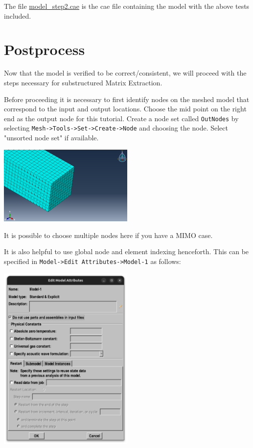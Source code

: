 \documentclass[11pt]{article}
\begin{document}
The file \href{https://github.com/Nidish96/Abaqus4Joints/blob/main/assets/assembly/model\_step2.cae}{model\_step2.cae} is the cae file containing the model with the above tests included.
\section{Postprocess}
\label{sec:org80ba178}
Now that the model is verified to be correct/consistent, we will proceed with the steps necessary for substructured Matrix Extraction.

Before proceeding it is necessary to first identify nodes on the meshed model that correspond to the input and output locations.
Choose the mid point on the right end as the output node for this tutorial.
Create a node set called \texttt{OutNodes} by selecting \texttt{Mesh->Tools->Set->Create->Node} and choosing the node. Select "unsorted node set" if available.
\begin{center}
\includegraphics[width=0.5\textwidth]{./figs/outnode.png}
\end{center}
It is possible to choose multiple nodes here if you have a MIMO case.

It is also helpful to use global node and element indexing henceforth.
This can be specified in \texttt{Model->Edit Attributes->Model-1} as follows:
\begin{center}
\includegraphics[width=0.5\textwidth]{./figs/modl.png}
\end{center}
\end{document}
